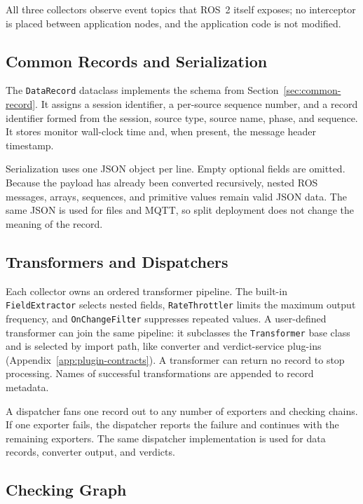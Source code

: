 All three collectors observe event topics that ROS~2 itself exposes; no
interceptor is placed between application nodes, and the application code is
not modified.

\subsection{Common Records and Serialization}\label{sec:impl-records}

The \texttt{DataRecord} dataclass implements the schema from
Section~\ref{sec:common-record}. It assigns a session identifier, a per-source
sequence number, and a record identifier formed from the session, source type,
source name, phase, and sequence. It stores monitor wall-clock time and, when
present, the message header timestamp.

Serialization uses one JSON object per line. Empty optional fields are omitted.
Because the payload has already been converted recursively, nested ROS
messages, arrays, sequences, and primitive values remain valid JSON data. The
same JSON is used for files and MQTT, so split deployment does not change the
meaning of the record.

\subsection{Transformers and Dispatchers}\label{sec:impl-transformers}

Each collector owns an ordered transformer pipeline. The built-in
\texttt{FieldExtractor} selects nested fields, \texttt{RateThrottler} limits the
maximum output frequency, and \texttt{OnChangeFilter} suppresses repeated
values. A user-defined transformer can join the same pipeline: it subclasses
the \texttt{Transformer} base class and is selected by import path, like
converter and verdict-service plug-ins
(Appendix~\ref{app:plugin-contracts}). A transformer can return no record to
stop processing. Names of successful transformations are appended to record
metadata.

A dispatcher fans one record out to any number of exporters and checking
chains. If one exporter fails, the dispatcher reports the failure and
continues with the remaining exporters. The same dispatcher implementation is
used for data records, converter output, and verdicts.

\subsection{Checking Graph}


